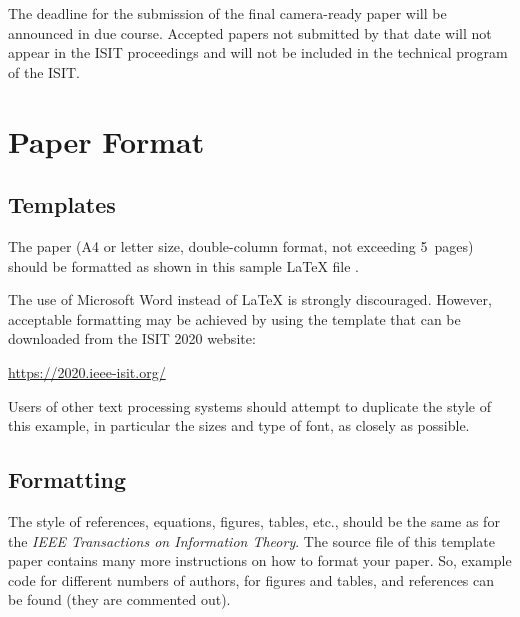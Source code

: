 \documentclass[conference,letterpaper]{IEEEtran}
\begin{document}
The deadline for the submission of the final camera-ready paper will
be announced in due course.  Accepted papers not submitted by that
date will not appear in the ISIT proceedings and will not be included
in the technical program of the ISIT.


\section{Paper Format}

\subsection{Templates}

The paper (A4 or letter size, double-column format, not exceeding
5~pages) should be formatted as shown in this sample \LaTeX{} file
\cite{Laport:LaTeX, GMS:LaTeXComp, oetiker_latex, typesetmoser}.

The use of Microsoft Word instead of \LaTeX{} is strongly
discouraged. However, acceptable formatting may be achieved by using
the template that can be downloaded from the ISIT 2020 website:
\begin{center}
  \url{https://2020.ieee-isit.org/}
\end{center}

Users of other text processing systems should attempt to duplicate the
style of this example, in particular the sizes and type of font, as
closely as possible.


\subsection{Formatting}

The style of references, equations, figures, tables, etc., should be
the same as for the \emph{IEEE Transactions on Information
  Theory}. The source file of this template paper contains many more
instructions on how to format your paper. So, example code for
different numbers of authors, for figures and tables, and references
can be found (they are commented out).

\end{document}
